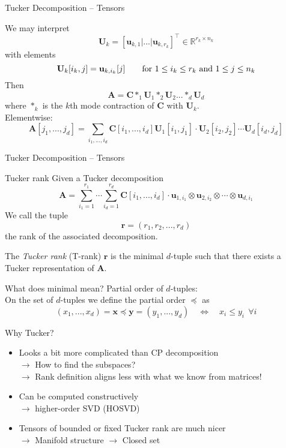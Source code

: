 \documentclass{beamer}
\newcommand{\bvec}[1]{\mathbf{#1}}
\newcommand{\vr}{\bvec{r}}
\newcommand{\vu}{\bvec{u}}
\newcommand{\vx}{\bvec{x}}
\newcommand{\vy}{\bvec{y}}
\newcommand{\vA}{\bvec{A}}
\newcommand{\vC}{\bvec{C}}
\newcommand{\vU}{\bvec{U}}
\newcommand{\bitem}{\item[$\bullet$]}
\begin{document}
\begin{frame}{Tucker Decomposition -- Tensors}

We may interpret 
$$
\vU_k = [\vu_{k,1}| ... | \vu_{k,r_k}]^\top \in \mathbb{R}^{r_k \times n_k}
$$
with elements
$$
\vU_k [i_k, j]
=
\vu_{k,i_k}[j]
\qquad
{\rm for }~
1\leq i_k \leq r_k ~{\rm and}~1 \leq j \leq n_k
$$
\pause
Then
$$
\vA = \vC *_{1} \vU_1 *_{2} \vU_2 ... *_{d} \vU_d
$$
where $*_k$ is the $k$th mode contraction of $\vC$ with $\vU_k$.\\
\pause
Elementwise:
$$
\vA[j_1,...,j_d]
=
\sum_{i_1,...,i_d}
\vC[i_1,...,i_d] \vU_{1}[i_1,j_1]\cdot \vU_{2}[i_2,j_2]\cdots\vU_{d}[i_d,j_d]
$$

\end{frame}

\begin{frame}{Tucker Decomposition -- Tensors}
    
\end{frame}

\begin{frame}{Tucker rank}
Given a Tucker decomposition
$$
\vA = \sum_{i_1  = 1}^{r_1} \cdots \sum_{i_d  = 1}^{r_d}
\vC[i_1,...,i_d] \cdot \vu_{1,i_1}\otimes \vu_{2,i_2}\otimes \cdots \otimes \vu_{d,i_1}
$$
We call the tuple
$$
\vr = (r_1,r_2,...,r_d)
$$
the rank of the associated decomposition. \\
\begin{center}
The {\it Tucker rank} (T-rank) $\vr$ is the minimal $d$-tuple such that there exists a Tucker representation of $\vA$.
\end{center}
What does minimal mean?
\pause
Partial order of $d$-tuples:\\
On the set of $d$-tuples we define the partial order $\preccurlyeq$ as
$$
(x_1,...,x_d) = \vx \preccurlyeq \vy = (y_1,...,y_d) \quad \Leftrightarrow \quad  x_i \leq y_i ~~\forall i  
$$

\end{frame}


\begin{frame}{Why Tucker?}

\begin{itemize}
    \bitem Looks a bit more complicated than CP decomposition\\
    $\rightarrow$ How to find the subspaces?\\
    $\rightarrow$ Rank definition aligns less with what we know from matrices! 
    \bitem Can be computed constructively\\
    $\rightarrow$ higher-order SVD (HOSVD)
    \bitem Tensors of bounded or fixed Tucker rank are much nicer\\
    $\rightarrow$ Manifold structure 
    $\rightarrow$ Closed set
\end{itemize}

\end{frame}
\end{document}
